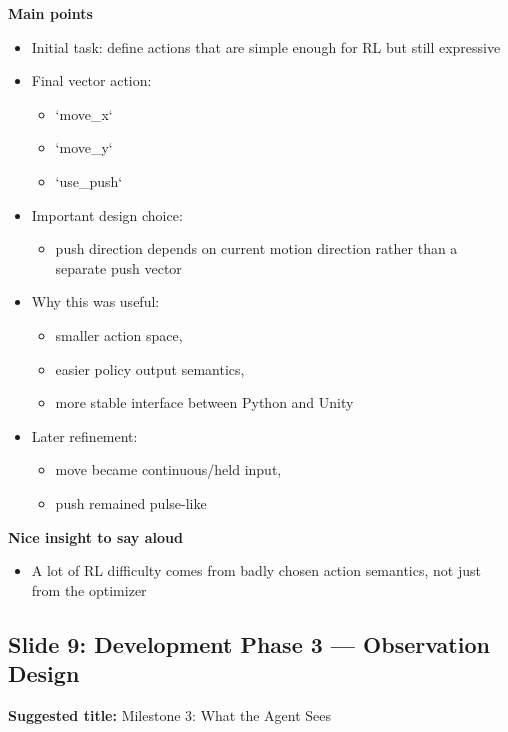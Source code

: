 \documentclass[11pt]{article}
\begin{document}
\textbf{Main points}
\begin{itemize}
    \item Initial task: define actions that are simple enough for RL but still expressive
    \item Final vector action:
    \begin{itemize}
        \item `move_x`
        \item `move_y`
        \item `use_push`
    \end{itemize}
    \item Important design choice:
    \begin{itemize}
        \item push direction depends on current motion direction rather than a separate push vector
    \end{itemize}
    \item Why this was useful:
    \begin{itemize}
        \item smaller action space,
        \item easier policy output semantics,
        \item more stable interface between Python and Unity
    \end{itemize}
    \item Later refinement:
    \begin{itemize}
        \item move became continuous/held input,
        \item push remained pulse-like
    \end{itemize}
\end{itemize}

\textbf{Nice insight to say aloud}
\begin{itemize}
    \item A lot of RL difficulty comes from badly chosen action semantics, not just from the optimizer
\end{itemize}

\subsection*{Slide 9: Development Phase 3 --- Observation Design}

\textbf{Suggested title:} Milestone 3: What the Agent Sees
\end{document}
